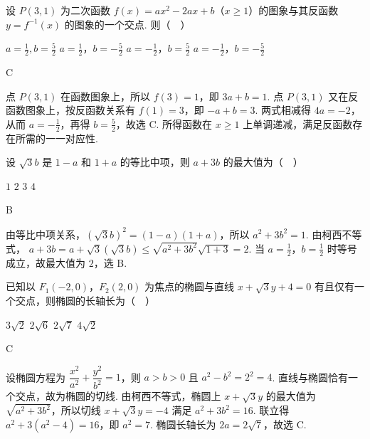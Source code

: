 \begin{problem}
设 \(P(3,1)\) 为二次函数 \(f(x) = ax^{2} - 2ax + b\)（\(x \geqslant 1\)）的图象与其反函数 \(y = f^{-1}(x)\) 的图象的一个交点. 则（\(\quad\)）

\choices
    {\(a = \frac{1}{2}, b = \frac{5}{2}\)}
    {\(a = \frac{1}{2}\)，\(b = -\frac{5}{2}\)}
    {\(a = -\frac{1}{2}\)，\(b = \frac{5}{2}\)}
    {\(a = -\frac{1}{2}\)，\(b = -\frac{5}{2}\)}
\end{problem}

\begin{answer}
C
\end{answer}

\begin{solution}
点 \(P(3,1)\) 在函数图象上，所以 \(f(3)=1\)，即 \(3a+b=1\). 点 \(P(3,1)\) 又在反函数图象上，按反函数关系有 \(f(1)=3\)，即 \(-a+b=3\). 两式相减得 \(4a=-2\)，从而 \(a=-\frac12\)，再得 \(b=\frac52\)，故选 C. 所得函数在 \(x\geqslant1\) 上单调递减，满足反函数存在所需的一一对应性.
\end{solution}

\begin{problem}
设 \(\sqrt{3}b\) 是 \(1 - a\) 和 \(1 + a\) 的等比中项，则 \(a + 3b\) 的最大值为（\(\quad\)）

\choices
    {\(1\)}
    {\(2\)}
    {\(3\)}
    {\(4\)}
\end{problem}

\begin{answer}
B
\end{answer}

\begin{solution}
由等比中项关系，\((\sqrt3b)^2=(1-a)(1+a)\)，所以 \(a^2+3b^2=1\). 由柯西不等式，
\(a+3b=a+\sqrt3(\sqrt3b)\leqslant\sqrt{a^2+3b^2}\sqrt{1+3}=2\). 当 \(a=\frac12\)，\(b=\frac12\) 时等号成立，故最大值为 \(2\)，选 B.
\end{solution}

\begin{problem}
已知以 \(F_{1}(-2,0)\)，\(F_{2}(2,0)\) 为焦点的椭圆与直线 \(x + \sqrt{3} y + 4 = 0\) 有且仅有一个交点，则椭圆的长轴长为（\(\quad\)）

\choices
    {\(3\sqrt{2}\)}
    {\(2\sqrt{6}\)}
    {\(2\sqrt{7}\)}
    {\(4\sqrt{2}\)}
\end{problem}

\begin{answer}
C
\end{answer}

\begin{solution}
设椭圆方程为 \(\dfrac{x^2}{a^2}+\dfrac{y^2}{b^2}=1\)，则 \(a>b>0\) 且 \(a^2-b^2=2^2=4\). 直线与椭圆恰有一个交点，故为椭圆的切线. 由柯西不等式，椭圆上 \(x+\sqrt3y\) 的最大值为 \(\sqrt{a^2+3b^2}\)，所以切线 \(x+\sqrt3y=-4\) 满足 \(a^2+3b^2=16\). 联立得 \(a^2+3(a^2-4)=16\)，即 \(a^2=7\). 椭圆长轴长为 \(2a=2\sqrt7\)，故选 C.
\end{solution}

